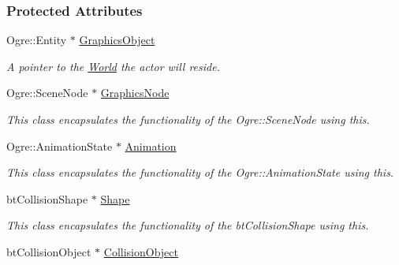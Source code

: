 \subsubsection*{Protected Attributes}
\begin{DoxyCompactItemize}
\item 
Ogre::Entity $\ast$ \hyperlink{classphys_1_1ActorBase_a25f3811fa1b2206dbabfaa2d6eb97784}{GraphicsObject}
\begin{DoxyCompactList}\small\item\em A pointer to the \hyperlink{classphys_1_1World}{World} the actor will reside. \item\end{DoxyCompactList}\item 
\hypertarget{classphys_1_1ActorBase_a7262c31023ff41a027206e47befc7417}{
Ogre::SceneNode $\ast$ \hyperlink{classphys_1_1ActorBase_a7262c31023ff41a027206e47befc7417}{GraphicsNode}}
\label{d8/d0f/classphys_1_1ActorBase_a7262c31023ff41a027206e47befc7417}

\begin{DoxyCompactList}\small\item\em This class encapsulates the functionality of the Ogre::SceneNode using this. \item\end{DoxyCompactList}\item 
\hypertarget{classphys_1_1ActorBase_aed2853b0a97e12aa73f6167aa572e5f3}{
Ogre::AnimationState $\ast$ \hyperlink{classphys_1_1ActorBase_aed2853b0a97e12aa73f6167aa572e5f3}{Animation}}
\label{d8/d0f/classphys_1_1ActorBase_aed2853b0a97e12aa73f6167aa572e5f3}

\begin{DoxyCompactList}\small\item\em This class encapsulates the functionality of the Ogre::AnimationState using this. \item\end{DoxyCompactList}\item 
\hypertarget{classphys_1_1ActorBase_a643613ce7abb4b6d4352bab036b7cf69}{
btCollisionShape $\ast$ \hyperlink{classphys_1_1ActorBase_a643613ce7abb4b6d4352bab036b7cf69}{Shape}}
\label{d8/d0f/classphys_1_1ActorBase_a643613ce7abb4b6d4352bab036b7cf69}

\begin{DoxyCompactList}\small\item\em This class encapsulates the functionality of the btCollisionShape using this. \item\end{DoxyCompactList}\item 
\hypertarget{classphys_1_1ActorBase_a70676c52ffee64705a7b463d29b60429}{
btCollisionObject $\ast$ \hyperlink{classphys_1_1ActorBase_a70676c52ffee64705a7b463d29b60429}{CollisionObject}}
\label{d8/d0f/classphys_1_1ActorBase_a70676c52ffee64705a7b463d29b60429}


\end{DoxyCompactItemize}
